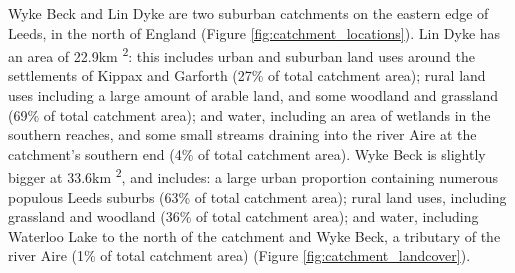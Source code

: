 \documentclass[APA,Times2COL]{WileyNJDv5}
\begin{document}
Wyke Beck and Lin Dyke are two suburban catchments on the eastern edge of Leeds, in the north of England (Figure \ref{fig:catchment_locations}). Lin Dyke has an area of 22.9km \textsuperscript{2}: this includes urban and suburban land uses around the settlements of Kippax and Garforth (27\% of total catchment area); rural land uses including a large amount of arable land, and some woodland and grassland (69\% of total catchment area); and water, including an area of wetlands in the southern reaches, and some small streams draining into the river Aire at the catchment's southern end (4\% of total catchment area). 
Wyke Beck is slightly bigger at 33.6km \textsuperscript{2}, and includes: a large urban proportion containing numerous populous Leeds suburbs (63\% of total catchment area); rural land uses, including grassland and woodland (36\% of total catchment area); and water, including Waterloo Lake to the north of the catchment and Wyke Beck, a tributary of the river Aire (1\% of total catchment area) (Figure \ref{fig:catchment_landcover}). 

\end{document}
